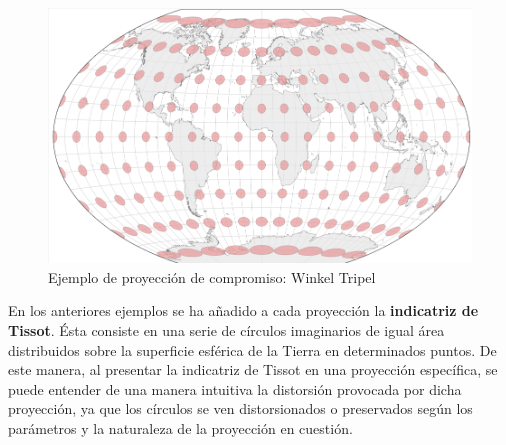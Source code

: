 \documentclass[
]{book}
\begin{document}
\begin{figure}

{\centering \includegraphics[width=0.3\linewidth]{img/comp} 

}

\caption{Ejemplo de proyección de compromiso: Winkel Tripel}\label{fig:comp}
\end{figure}

En los anteriores ejemplos se ha añadido a cada proyección la \textbf{indicatriz de
Tissot}. Ésta consiste en una serie de círculos imaginarios de igual área
distribuidos sobre la superficie esférica de la Tierra en determinados puntos.
De este manera, al presentar la indicatriz de Tissot en una proyección
específica, se puede entender de una manera intuitiva la distorsión provocada
por dicha proyección, ya que los círculos se ven distorsionados o preservados
según los parámetros y la naturaleza de la proyección en cuestión.

  
\end{document}
